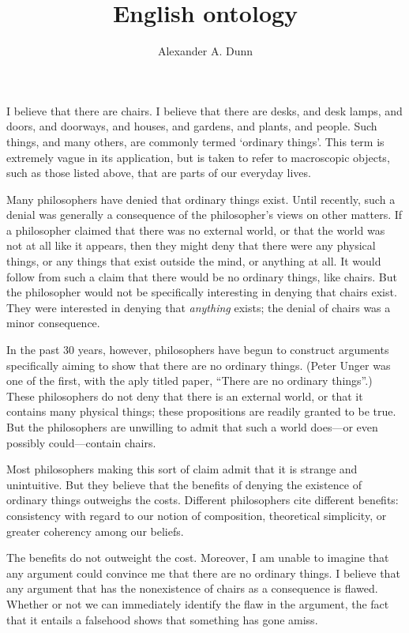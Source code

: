 \documentclass[11pt]{article}
\title{English ontology}
\author{Alexander A. Dunn}
\begin{document}
\ifstandalone
\maketitle
\begin{spacing}{1.25}
\fi

I believe that there are chairs.  I believe that there are desks, and
desk lamps, and doors, and doorways, and houses, and gardens, and
plants, and people.  Such things, and many others, are commonly termed
`ordinary things'.  This term is extremely vague in its application,
but is taken to refer to macroscopic objects, such as those listed
above, that are parts of our everyday lives.

Many philosophers have denied that ordinary things exist.  Until
recently, such a denial was generally a consequence of the
philosopher's views on other matters.  If a philosopher claimed that
there was no external world, or that the world was not at all like it
appears, then they might deny that there were any physical things, or
any things that exist outside the mind, or anything at all.  It would
follow from such a claim that there would be no ordinary things, like
chairs.  But the philosopher would not be specifically interesting in
denying that chairs exist.  They were interested in denying that {\em
  anything} exists; the denial of chairs was a minor consequence.

In the past 30 years, however, philosophers have begun to construct
arguments specifically aiming to show that there are no ordinary
things.  (Peter Unger was one of the first, with the aply titled
paper, ``There are no ordinary things''.)  These philosophers do not
deny that there is an external world, or that it contains many
physical things; these propositions are readily granted to be true.
But the philosophers are unwilling to admit that such a world
does---or even possibly could---contain chairs.

Most philosophers making this sort of claim admit that it is strange
and unintuitive.  But they believe that the benefits of denying the
existence of ordinary things outweighs the costs.  Different
philosophers cite different benefits: consistency with regard to our
notion of composition, theoretical simplicity, or greater coherency
among our beliefs.  

The benefits do not outweight the cost.  Moreover, I am unable to
imagine that any argument could convince me that there are no ordinary
things.  I believe that any argument that has the nonexistence of
chairs as a consequence is flawed.  Whether or not we can immediately
identify the flaw in the argument, the fact that it entails a
falsehood shows that something has gone amiss.


\end{spacing}
\end{document}
